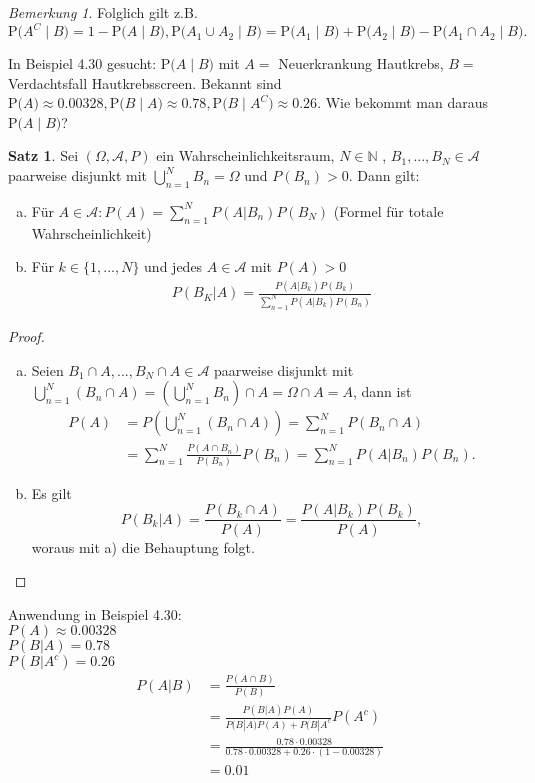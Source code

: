 \documentclass[a4paper,12pt,fleqn]{scrartcl}
\newcommand{\m}[1]{\mathcal{ #1 }}
\newcommand{\p}[1]{\text{P(} #1 \text{)}}
\newcommand{\WR}{Wahrscheinlichkeitsraum}
\theoremstyle{definition}
\newtheorem{satz}[definition]{Satz}
\theoremstyle{plain}
\theoremstyle{remark}
\newtheorem*{bemerkung}{Bemerkung}
\begin{document}
\begin{bemerkung}
Folglich gilt z.B. $\p{A^C \mid B} = 1 - \p{A \mid B}, \p{A_1 \cup A_2 \mid B} = \p{A_1 \mid B} + \p{A_2 \mid B} - \p{A_1 \cap A_2 \mid B}.$
\end{bemerkung}
In Beispiel 4.30 gesucht: $\p{A \mid B}$ mit $A=$ \glqq Neuerkrankung Hautkrebs\grqq, $B=$ \glqq Verdachtsfall Hautkrebsscreen\grqq. Bekannt sind $\p{A} \approx 0.00328, \p{B \mid A} \approx 0.78, \p{B \mid A^C} \approx 0.26$. Wie bekommt man daraus $\p{A \mid B}$?

\begin{satz}
Sei $(\Omega, \m{A}, P)$ ein \WR, $N \in \mathbb{N}$ , $B_1 , ... , B_N \in \m{A}$ paarweise disjunkt mit $\bigcup_{n = 1}^{N}{B_n} = \Omega$ und $P(B_n) > 0 $. Dann gilt:
\begin{enumerate}[a)]
\item Für $A \in \m{A}: P(A) = \sum_{n=1}^{N}{P(A|B_n)P(B_N)}$ (Formel für totale Wahrscheinlichkeit)
\item Für $k \in \{ 1,...,N \} $ und jedes $A \in \m{A}$ mit $P(A) > 0$
\begin{align*}
P(B_K | A) = \frac{P(A|B_k)P(B_k)}{\sum_{n=1}^{N}{P(A|B_k)P(B_n)}}
\end{align*}
\end{enumerate} 
\end{satz}
\begin{proof}
\begin{enumerate}[a)]
\item Seien $B_1 \cap A,...,B_N \cap A \in \m{A}$ paarweise disjunkt mit $ \bigcup_{n=1}^{N}{(B_n \cap A)} = ( \bigcup_{n=1}^{N}{B_n}) \cap A = \Omega \cap A = A $, dann ist
\begin{align*}
P(A) &= P( \bigcup_{n=1}^{N}{(B_n \cap A)} ) = \sum_{n=1}^{N}{P(B_n \cap A)} \\
 &= \sum_{n=1}^{N}{ \frac{P(A \cap B_n)}{P(B_n)}P(B_n)} = \sum_{n=1}^{N}{P(A|B_n)P(B_n)}.
\end{align*}
\item Es gilt
\[P(B_k|A) = \frac{P(B_k \cap A)}{P(A)} = \frac{P(A|B_k)P(B_k)}{P(A)},\]
woraus mit a) die Behauptung folgt.
\end{enumerate}
\end{proof}

Anwendung in Beispiel 4.30:\\
$P(A) \approx 0.00328$ \\
$P(B | A ) = 0.78 $\\
$P(B|A^c) = 0.26$
\begin{align*}
P(A|B) &= \frac{P(A \cap B)}{P(B)} \\
&= \frac{P(B|A)P(A)}{P(B|A)P(A)+P(B|A^c}P(A^c) \\
&= \frac{0.78 \cdot 0.00328}{0.78 \cdot 0.00328 + 0.26 \cdot (1-0.00328)}\\
&= 0.01 
\end{align*}
\end{document}
